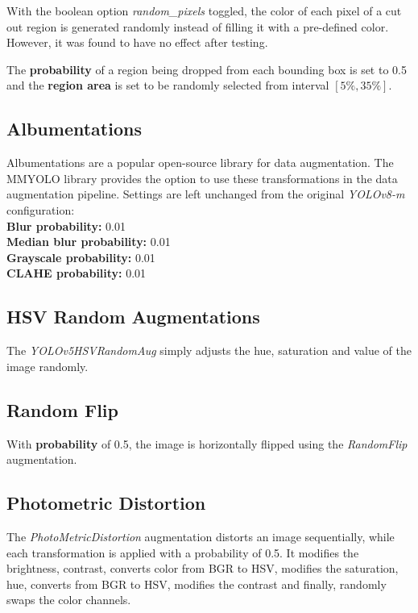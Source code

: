 With the boolean option \textit{random\_pixels} toggled, the color of each pixel
of a cut out region is generated randomly instead of filling it with a
pre-defined color. However, it was found to have no effect after testing.

The \textbf{probability} of a region being dropped from each bounding box is set
to 0.5 and the \textbf{region area} is set to be randomly selected from
interval $[5\%, 35\%]$.

\subsection*{Albumentations}

Albumentations\cite{Albumentations} are a popular open-source library for data
augmentation. The MMYOLO  library provides the option
to use these transformations in the data augmentation pipeline. Settings are left unchanged from the original 
\textit{YOLOv8-m} configuration: \\
\textbf{Blur probability:} 0.01 \\
\textbf{Median blur probability:} 0.01 \\
\textbf{Grayscale probability:} 0.01 \\
\textbf{CLAHE probability:} 0.01

\subsection*{HSV Random Augmentations}

The \textit{YOLOv5HSVRandomAug} simply adjusts the hue, saturation and value of
the image randomly.

\subsection*{Random Flip}

With \textbf{probability} of 0.5, the image is horizontally flipped using the
\textit{RandomFlip} augmentation.

\subsection*{Photometric Distortion}

The \textit{PhotoMetricDistortion} augmentation distorts an image sequentially,
while each transformation is applied with a probability of 0.5. It modifies the
brightness, contrast, converts color from BGR to HSV, modifies the saturation,
hue, converts from BGR to HSV, modifies the contrast and finally, randomly swaps
the color channels.

